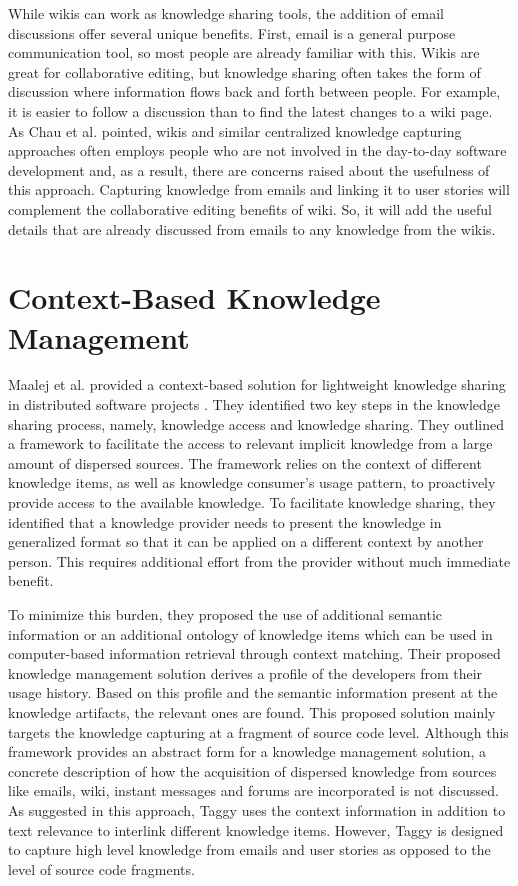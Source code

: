 While wikis can work as knowledge sharing tools, the addition of email discussions offer several unique benefits. First, email is a general purpose communication tool, so most people are already familiar with this. Wikis are great for collaborative editing, but knowledge sharing often takes the form of discussion where information flows back and forth between people. For example, it is easier to follow a discussion than to find the latest changes to a  wiki page. As Chau et al. pointed, wikis and similar centralized knowledge capturing approaches often employs people who are not involved in the day-to-day software development and, as a result, there are concerns raised about the usefulness of this approach\cite{a_case_study_of_wiki}. Capturing knowledge from emails and linking it to user stories will complement the collaborative editing benefits of wiki. So, it will add the useful details that are already discussed from emails to any knowledge from the wikis.

\section{Context-Based Knowledge Management}
Maalej et al. provided a context-based solution for lightweight knowledge sharing in distributed software projects \cite{a_lightweight}. They identified two key steps in the knowledge sharing process, namely, knowledge access and knowledge sharing. They outlined a framework to facilitate the access to relevant implicit knowledge from a large amount of dispersed sources. The framework relies on the context of different knowledge items, as well as knowledge consumer's usage pattern, to proactively provide access to the available knowledge. To facilitate knowledge sharing, they identified that a knowledge provider needs to present the knowledge in generalized format so that it can be applied on a different context by another person. This requires additional effort from the provider without much immediate benefit.

To minimize this burden, they proposed the use of additional semantic information or an additional ontology of knowledge items which can be used in computer-based information retrieval through context matching. Their proposed knowledge management solution derives a profile of the developers from their usage history. Based on this profile and the semantic information present at the knowledge artifacts, the relevant ones are found. This proposed solution mainly targets the knowledge capturing at a fragment of source code level. Although this framework provides an abstract form for a knowledge management solution, a concrete description of how the acquisition of dispersed knowledge from sources like emails, wiki, instant messages and forums are incorporated is not discussed. As suggested in this approach, Taggy uses the context information in addition to text relevance to interlink different knowledge items. However, Taggy is designed to capture high level knowledge from emails and user stories as opposed to the level of source code fragments.

